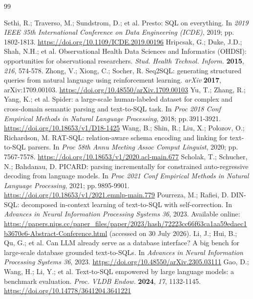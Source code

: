 \documentclass[applsci,article,submit,pdftex,oneauthor]{Definitions/mdpi}
\newcommand{\doilink}[1]{\begingroup\urlstyle{same}\url{#1}\endgroup}
\begin{document}
\begin{thebibliography}{99}\footnotesize

 Sethi, R.; Traverso, M.; Sundstrom, D.; et al. Presto: SQL on everything. In \textit{2019 IEEE 35th International Conference on Data Engineering (ICDE)}, 2019; pp.\,1802-1813. \doilink{https://doi.org/10.1109/ICDE.2019.00196}
 Hripcsak, G.; Duke, J.D.; Shah, N.H.; et al. Observational Health Data Sciences and Informatics (OHDSI): opportunities for observational researchers. \textit{Stud. Health Technol. Inform.} \textbf{2015}, \textit{216}, 574-578. 
 Zhong, V.; Xiong, C.; Socher, R. Seq2SQL: generating structured queries from natural language using reinforcement learning. \textit{arXiv} \textbf{2017}, arXiv:1709.00103. \doilink{https://doi.org/10.48550/arXiv.1709.00103}
 Yu, T.; Zhang, R.; Yang, K.; et al. Spider: a large-scale human-labeled dataset for complex and cross-domain semantic parsing and text-to-SQL task. In \textit{Proc 2018 Conf Empirical Methods in Natural Language Processing}, 2018; pp.\,3911-3921. \doilink{https://doi.org/10.18653/v1/D18-1425}
 Wang, B.; Shin, R.; Liu, X.; Polozov, O.; Richardson, M. RAT-SQL: relation-aware schema encoding and linking for text-to-SQL parsers. In \textit{Proc 58th Annu Meeting Assoc Comput Linguist}, 2020; pp.\,7567-7578. \doilink{https://doi.org/10.18653/v1/2020.acl-main.677}
 Scholak, T.; Schucher, N.; Bahdanau, D. PICARD: parsing incrementally for constrained auto-regressive decoding from language models. In \textit{Proc 2021 Conf Empirical Methods in Natural Language Processing}, 2021; pp.\,9895-9901. \doilink{https://doi.org/10.18653/v1/2021.emnlp-main.779}
 Pourreza, M.; Rafiei, D. DIN-SQL: decomposed in-context learning of text-to-SQL with self-correction. In \textit{Advances in Neural Information Processing Systems 36}, 2023. Available online: \url{https://papers.nips.cc/paper_files/paper/2023/hash/72223cc66f63ca1aa59edaec1b3670e6-Abstract-Conference.html} (accessed on 30 July 2026). 
 Li, J.; Hui, B.; Qu, G.; et al. Can LLM already serve as a database interface? A big bench for large-scale database grounded text-to-SQLs. In \textit{Advances in Neural Information Processing Systems 36}, 2023. \doilink{https://doi.org/10.48550/arXiv.2305.03111}
 Gao, D.; Wang, H.; Li, Y.; et al. Text-to-SQL empowered by large language models: a benchmark evaluation. \textit{Proc. VLDB Endow.} \textbf{2024}, \textit{17}, 1132-1145. \doilink{https://doi.org/10.14778/3641204.3641221}

\end{thebibliography}
\end{document}
